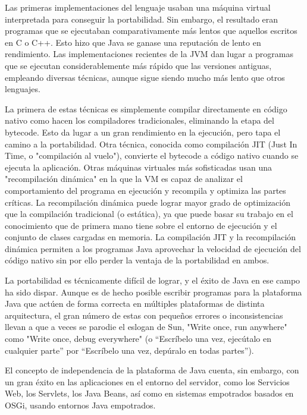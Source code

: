 \documentclass[11pt,a4paper]{$type}
\begin{document}
	\bigskip
							Las primeras implementaciones del lenguaje usaban una máquina virtual interpretada para conseguir la portabilidad. Sin embargo, el resultado eran programas que se ejecutaban comparativamente más lentos que aquellos escritos en C o C++. Esto hizo que Java se ganase una reputación de lento en rendimiento. Las implementaciones recientes de la JVM dan lugar a programas que se ejecutan considerablemente más rápido que las versiones antiguas, empleando diversas técnicas, aunque sigue siendo mucho más lento que otros lenguajes.
	\bigskip
							
	\bigskip
							La primera de estas técnicas es simplemente compilar directamente en código nativo como hacen los compiladores tradicionales, eliminando la etapa del bytecode. Esto da lugar a un gran rendimiento en la ejecución, pero tapa el camino a la portabilidad. Otra técnica, conocida como compilación JIT (Just In Time, o "compilación al vuelo"), convierte el bytecode a código nativo cuando se ejecuta la aplicación. Otras máquinas virtuales más sofisticadas usan una "recompilación dinámica" en la que la VM es capaz de analizar el comportamiento del programa en ejecución y recompila y optimiza las partes críticas. La recompilación dinámica puede lograr mayor grado de optimización que la compilación tradicional (o estática), ya que puede basar su trabajo en el conocimiento que de primera mano tiene sobre el entorno de ejecución y el conjunto de clases cargadas en memoria. La compilación JIT y la recompilación dinámica permiten a los programas Java aprovechar la velocidad de ejecución del código nativo sin por ello perder la ventaja de la portabilidad en ambos.
	\bigskip
							
	\bigskip
							La portabilidad es técnicamente difícil de lograr, y el éxito de Java en ese campo ha sido dispar. Aunque es de hecho posible escribir programas para la plataforma Java que actúen de forma correcta en múltiples plataformas de distinta arquitectura, el gran número de estas con pequeños errores o inconsistencias llevan a que a veces se parodie el eslogan de Sun, "Write once, run anywhere" como "Write once, debug everywhere" (o “Escríbelo una vez, ejecútalo en cualquier parte” por “Escríbelo una vez, depúralo en todas partes”).
	\bigskip
							
	\bigskip
							El concepto de independencia de la plataforma de Java cuenta, sin embargo, con un gran éxito en las aplicaciones en el entorno del servidor, como los Servicios Web, los Servlets, los Java Beans, así como en sistemas empotrados basados en OSGi, usando entornos Java empotrados.
	\bigskip
							
\end{document}
